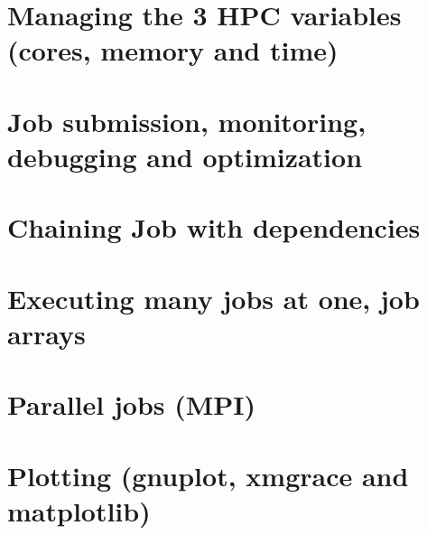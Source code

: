 \section{Managing the 3 HPC variables (cores, memory and time)}
\section{Job submission, monitoring, debugging and optimization}
\section{Chaining Job with dependencies}
\section{Executing many jobs at one, job arrays}
\section{Parallel jobs (MPI)}
\section{Plotting (gnuplot, xmgrace and matplotlib)}


